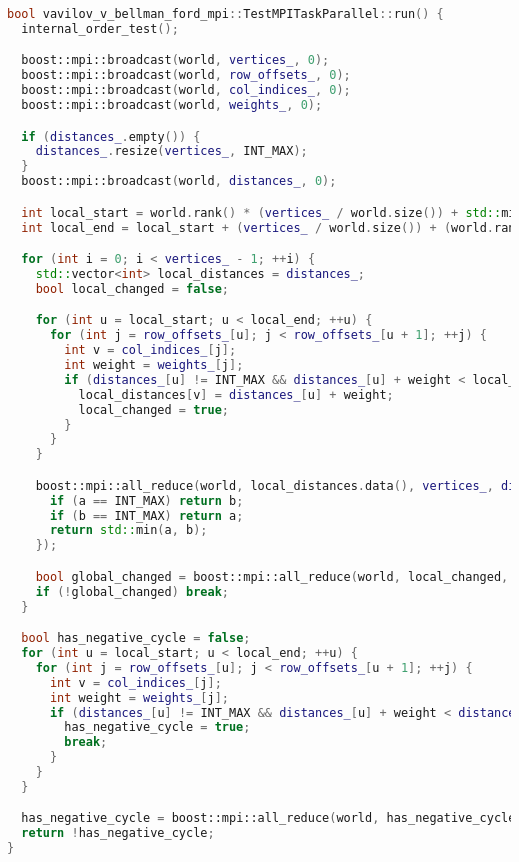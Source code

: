 \documentclass[12pt]{article}
\begin{document}
\begin{lstlisting}[language=C++, caption={Параллельная MPI-реализация алгоритма Беллмана–Форда}]
bool vavilov_v_bellman_ford_mpi::TestMPITaskParallel::run() {
  internal_order_test();

  boost::mpi::broadcast(world, vertices_, 0);
  boost::mpi::broadcast(world, row_offsets_, 0);
  boost::mpi::broadcast(world, col_indices_, 0);
  boost::mpi::broadcast(world, weights_, 0);

  if (distances_.empty()) {
    distances_.resize(vertices_, INT_MAX);
  }
  boost::mpi::broadcast(world, distances_, 0);

  int local_start = world.rank() * (vertices_ / world.size()) + std::min(world.rank(), vertices_ % world.size());
  int local_end = local_start + (vertices_ / world.size()) + (world.rank() < vertices_ % world.size() ? 1 : 0);

  for (int i = 0; i < vertices_ - 1; ++i) {
    std::vector<int> local_distances = distances_;
    bool local_changed = false;

    for (int u = local_start; u < local_end; ++u) {
      for (int j = row_offsets_[u]; j < row_offsets_[u + 1]; ++j) {
        int v = col_indices_[j];
        int weight = weights_[j];
        if (distances_[u] != INT_MAX && distances_[u] + weight < local_distances[v]) {
          local_distances[v] = distances_[u] + weight;
          local_changed = true;
        }
      }
    }

    boost::mpi::all_reduce(world, local_distances.data(), vertices_, distances_.data(), [](int a, int b) {
      if (a == INT_MAX) return b;
      if (b == INT_MAX) return a;
      return std::min(a, b);
    });

    bool global_changed = boost::mpi::all_reduce(world, local_changed, std::logical_or<>());
    if (!global_changed) break;
  }

  bool has_negative_cycle = false;
  for (int u = local_start; u < local_end; ++u) {
    for (int j = row_offsets_[u]; j < row_offsets_[u + 1]; ++j) {
      int v = col_indices_[j];
      int weight = weights_[j];
      if (distances_[u] != INT_MAX && distances_[u] + weight < distances_[v]) {
        has_negative_cycle = true;
        break;
      }
    }
  }

  has_negative_cycle = boost::mpi::all_reduce(world, has_negative_cycle, std::logical_or<>());
  return !has_negative_cycle;
}
\end{lstlisting}
\end{document}
